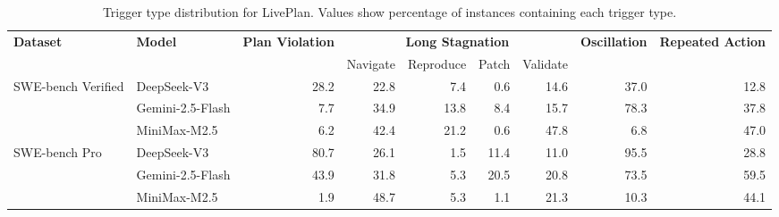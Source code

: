 \begin{table}[t]
\caption{Trigger type distribution for LivePlan. Values show percentage of instances containing each trigger type.}
\label{tab:trigger_distribution}
\centering
\scriptsize
\begin{tabular}{@{}llrrrrrrr@{}}
\toprule
\multirow{2}{*}{\textbf{Dataset}} & \multirow{2}{*}{\textbf{Model}} & \multirow{2}{*}{\textbf{Plan Violation}} & \multicolumn{4}{c}{\textbf{Long Stagnation}} & \multirow{2}{*}{\textbf{Oscillation}} & \multirow{2}{*}{\textbf{Repeated Action}} \\
\cmidrule(lr){4-7}
 & & & Navigate & Reproduce & Patch & Validate & & \\
\midrule
\multirow{3}{*}{SWE-bench Verified} & DeepSeek-V3 & 28.2 & 22.8 & 7.4 & 0.6 & 14.6 & 37.0 & 12.8 \\
 & Gemini-2.5-Flash & 7.7 & 34.9 & 13.8 & 8.4 & 15.7 & 78.3 & 37.8 \\
 & MiniMax-M2.5 & 6.2 & 42.4 & 21.2 & 0.6 & 47.8 & 6.8 & 47.0 \\
\midrule
\multirow{3}{*}{SWE-bench Pro} & DeepSeek-V3 & 80.7 & 26.1 & 1.5 & 11.4 & 11.0 & 95.5 & 28.8 \\
 & Gemini-2.5-Flash & 43.9 & 31.8 & 5.3 & 20.5 & 20.8 & 73.5 & 59.5 \\
 & MiniMax-M2.5 & 1.9 & 48.7 & 5.3 & 1.1 & 21.3 & 10.3 & 44.1 \\
\bottomrule
\end{tabular}
\end{table}
